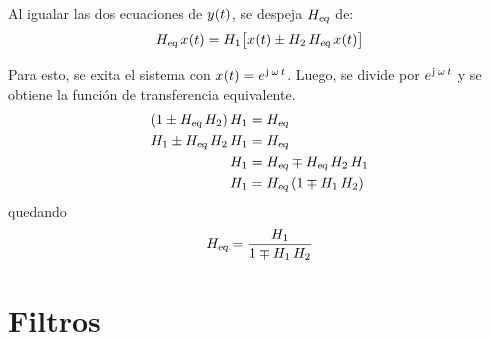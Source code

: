 Al igualar las dos ecuaciones de $\fx[y]{t}$, se despeja $\sub{H}{eq}$ de:
\[
    \sub{H}{eq} \, \fx[x]{t}
    = H_1 \inBrackets{\fx[x]{t} \pm H_2 \, \sub{H}{eq} \, \fx[x]{t}}
\]

Para esto, se exita el sistema con $\fx[x]{t} = e^{\iu \, \omega \, t}$.
Luego, se divide por $e^{\iu \, \omega \, t}$ y se obtiene la función de transferencia equivalente.
\begin{align*}
    \inParentheses{1 \pm \sub{H}{eq} \, H_2} H_1
    & = \sub{H}{eq}
    \\
    H_1 \pm \sub{H}{eq} \, H_2 \, H_1
    & = \sub{H}{eq}
    \\
    H_1
    & = \sub{H}{eq} \mp \sub{H}{eq} \, H_2 \, H_1
    \\
    H_1
    & = \sub{H}{eq} \inParentheses{1 \mp H_1 \, H_2}
\end{align*}
quedando
\[
    \sub{H}{eq} = \frac{H_1}{1 \mp H_1 \, H_2}
\]

\section{Filtros}